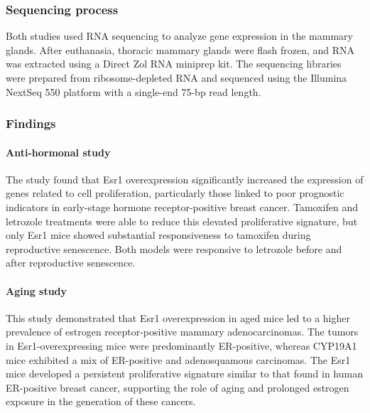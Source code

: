 \subsubsection{Sequencing process}
Both studies used RNA sequencing to analyze gene expression in the mammary
glands.
After euthanasia, thoracic mammary glands were flash frozen, and RNA was
extracted using a Direct Zol RNA miniprep kit.
The sequencing libraries were prepared from ribosome-depleted RNA and sequenced
using the Illumina NextSeq 550 platform with a single-end 75-bp read
length\supercite{furth_esr1_2023,furth_overexpression_2023}.

\subsubsection{Findings}

\paragraph{Anti-hormonal study}
The study found that Esr1 overexpression significantly increased the expression
of genes related to cell proliferation, particularly those linked to poor
prognostic indicators in early-stage hormone receptor-positive breast cancer.
Tamoxifen and letrozole treatments were able to reduce this elevated
proliferative signature, but only Esr1 mice showed substantial responsiveness
to tamoxifen during reproductive senescence.
Both models were responsive to letrozole before and after reproductive
senescence\supercite{furth_esr1_2023}.

\paragraph{Aging study}
This study demonstrated that Esr1 overexpression in aged mice led to a higher
prevalence of estrogen receptor-positive mammary adenocarcinomas.
The tumors in Esr1-overexpressing mice were predominantly ER-positive, whereas
CYP19A1 mice exhibited a mix of ER-positive and adenosquamous carcinomas.
The Esr1 mice developed a persistent proliferative signature similar to that
found in human ER-positive breast cancer, supporting the role of aging and
prolonged estrogen exposure in the generation of these
cancers\supercite{furth_overexpression_2023}.
